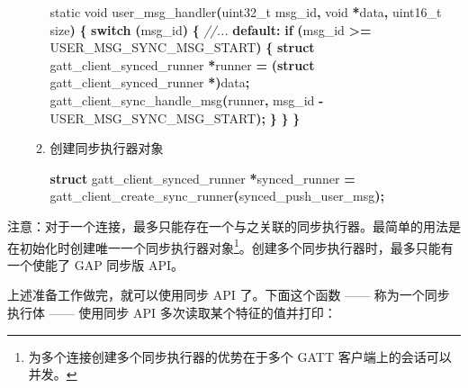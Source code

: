\documentclass[
  12pt,
]{book}
\newenvironment{Shaded}{\begin{snugshade}}{\end{snugshade}}
\newcommand{\CommentTok}[1]{\textcolor[rgb]{0.56,0.35,0.01}{\textit{#1}}}
\newcommand{\ControlFlowTok}[1]{\textcolor[rgb]{0.13,0.29,0.53}{\textbf{#1}}}
\newcommand{\DataTypeTok}[1]{\textcolor[rgb]{0.13,0.29,0.53}{#1}}
\newcommand{\KeywordTok}[1]{\textcolor[rgb]{0.13,0.29,0.53}{\textbf{#1}}}
\newcommand{\NormalTok}[1]{#1}
\newcommand{\OperatorTok}[1]{\textcolor[rgb]{0.81,0.36,0.00}{\textbf{#1}}}
\begin{document}
\begin{itemize}
\begin{enumerate}
\begin{Shaded}
\begin{Highlighting}[]
\DataTypeTok{static} \DataTypeTok{void}\NormalTok{ user\_msg\_handler}\OperatorTok{(}\DataTypeTok{uint32\_t}\NormalTok{ msg\_id}\OperatorTok{,} \DataTypeTok{void} \OperatorTok{*}\NormalTok{data}\OperatorTok{,}
    \DataTypeTok{uint16\_t}\NormalTok{ size}\OperatorTok{)}
\OperatorTok{\{}
    \ControlFlowTok{switch} \OperatorTok{(}\NormalTok{msg\_id}\OperatorTok{)}
    \OperatorTok{\{}
    \CommentTok{//...}
    \ControlFlowTok{default}\OperatorTok{:}
        \ControlFlowTok{if} \OperatorTok{(}\NormalTok{msg\_id }\OperatorTok{\textgreater{}=}\NormalTok{ USER\_MSG\_SYNC\_MSG\_START}\OperatorTok{)}
        \OperatorTok{\{}
            \KeywordTok{struct}\NormalTok{ gatt\_client\_synced\_runner }\OperatorTok{*}\NormalTok{runner }\OperatorTok{=}
                \OperatorTok{(}\KeywordTok{struct}\NormalTok{ gatt\_client\_synced\_runner }\OperatorTok{*)}\NormalTok{data}\OperatorTok{;}
\NormalTok{            gatt\_client\_sync\_handle\_msg}\OperatorTok{(}\NormalTok{runner}\OperatorTok{,}
\NormalTok{                msg\_id }\OperatorTok{{-}}\NormalTok{ USER\_MSG\_SYNC\_MSG\_START}\OperatorTok{);}
        \OperatorTok{\}}
    \OperatorTok{\}}
\OperatorTok{\}}
\end{Highlighting}
\end{Shaded}
  \item
    创建同步执行器对象

\begin{Shaded}
\begin{Highlighting}[]
\KeywordTok{struct}\NormalTok{ gatt\_client\_synced\_runner }\OperatorTok{*}\NormalTok{synced\_runner }\OperatorTok{=}
\NormalTok{    gatt\_client\_create\_sync\_runner}\OperatorTok{(}\NormalTok{synced\_push\_user\_msg}\OperatorTok{);}
\end{Highlighting}
\end{Shaded}
  \end{enumerate}
\end{itemize}

注意：对于一个连接，最多只能存在一个与之关联的同步执行器。最简单的用法是在初始化时创建唯一一个同步执行器对象\footnote{为多个连接创建多个同步执行器的优势在于多个
  GATT 客户端上的会话可以并发。}。创建多个同步执行器时，最多只能有一个使能了 GAP 同步版 API。

上述准备工作做完，就可以使用同步 API 了。下面这个函数 ------ 称为一个同步执行体 ------ 使用同步 API 多次读取某个特征的值并打印：
\end{document}
